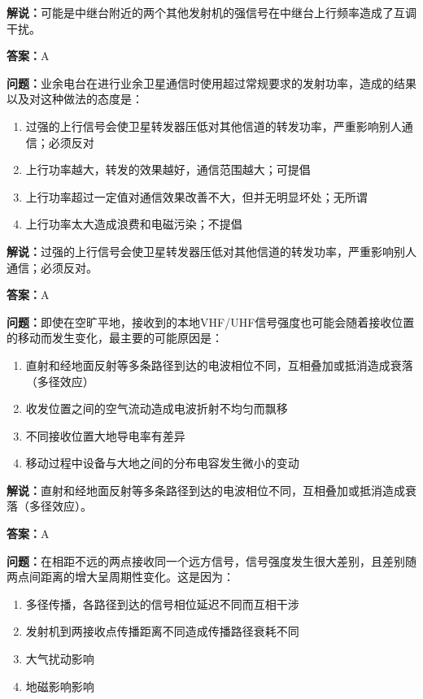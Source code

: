 \textbf{解说：}可能是中继台附近的两个其他发射机的强信号在中继台上行频率造成了互调干扰。%

\textbf{答案：}A

\textbf{问题：}业余电台在进行业余卫星通信时使用超过常规要求的发射功率，造成的结果以及对这种做法的态度是：

\begin{enumerate}[label=\Alph*), leftmargin=3em]
	\item 过强的上行信号会使卫星转发器压低对其他信道的转发功率，严重影响别人通信；必须反对
	\item 上行功率越大，转发的效果越好，通信范围越大；可提倡
	\item 上行功率超过一定值对通信效果改善不大，但并无明显坏处；无所谓
	\item 上行功率太大造成浪费和电磁污染；不提倡
\end{enumerate}

\textbf{解说：}过强的上行信号会使卫星转发器压低对其他信道的转发功率，严重影响别人通信；必须反对。%

\textbf{答案：}A

\textbf{问题：}即使在空旷平地，接收到的本地VHF/UHF信号强度也可能会随着接收位置的移动而发生变化，最主要的可能原因是：

\begin{enumerate}[label=\Alph*), leftmargin=3em]
	\item 直射和经地面反射等多条路径到达的电波相位不同，互相叠加或抵消造成衰落（多径效应）
	\item 收发位置之间的空气流动造成电波折射不均匀而飘移
	\item 不同接收位置大地导电率有差异
	\item 移动过程中设备与大地之间的分布电容发生微小的变动
\end{enumerate}

\textbf{解说：}直射和经地面反射等多条路径到达的电波相位不同，互相叠加或抵消造成衰落（多径效应）。%

\textbf{答案：}A

\textbf{问题：}在相距不远的两点接收同一个远方信号，信号强度发生很大差别，且差别随两点间距离的增大呈周期性变化。这是因为：

\begin{enumerate}[label=\Alph*), leftmargin=3em]
	\item 多径传播，各路径到达的信号相位延迟不同而互相干涉
	\item 发射机到两接收点传播距离不同造成传播路径衰耗不同
	\item 大气扰动影响
	\item 地磁影响影响
\end{enumerate}


